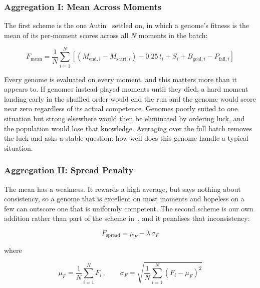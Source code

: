 \subsubsection{Aggregation I: Mean Across Moments}

The first scheme is the one Autin~\cite{autin2024} settled on, in which a
genome's fitness is the mean of its per-moment scores across all $N$ moments in
the batch:

\begin{equation}
    F_{\text{mean}} = \frac{1}{N} \sum_{i=1}^{N}
        \left[ \left( M_{\text{end},i} - M_{\text{start},i} \right)
        - 0.25\,t_{i} + S_{i} + B_{\text{goal},i} - P_{\text{fail},i} \right]
    \label{eq:fitness-moment-mean}
\end{equation}

\noindent
Every genome is evaluated on every moment, and this matters more than it
appears to. If genomes instead played moments until they died, a hard moment
landing early in the shuffled order would end the run and the genome would
score near zero regardless of its actual competence. Genomes poorly suited to
one situation but strong elsewhere would then be eliminated by ordering luck,
and the population would lose that knowledge. Averaging over the full batch
removes the luck and asks a stable question: how well does this genome handle a
typical situation.

\subsubsection{Aggregation II: Spread Penalty}

The mean has a weakness. It rewards a high average, but says nothing about
consistency, so a genome that is excellent on most moments and hopeless on a
few can outscore one that is uniformly competent. The second scheme is our own
addition rather than part of the scheme in~\cite{autin2024}, and it penalises
that inconsistency:

\begin{equation}
    F_{\text{spread}} = \mu_{F} - \lambda\,\sigma_{F}
    \label{eq:fitness-spread}
\end{equation}

\noindent
where

\begin{equation}
    \mu_{F} = \frac{1}{N} \sum_{i=1}^{N} F_{i}\,,
    \qquad
    \sigma_{F} = \sqrt{\frac{1}{N} \sum_{i=1}^{N}
        \left( F_{i} - \mu_{F} \right)^{2}}
    \label{eq:mean-std}
\end{equation}

